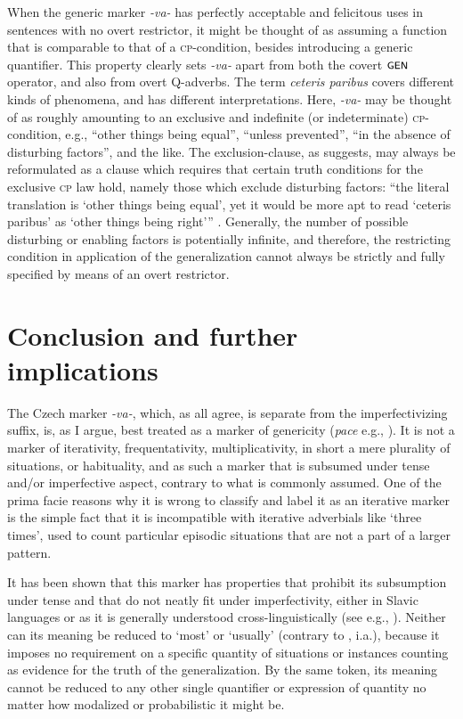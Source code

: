 \documentclass[output=paper,colorlinks,citecolor=brown]{langscibook}
\begin{document}
When the generic marker \textit{-va-} has perfectly acceptable and felicitous uses in sentences with no overt restrictor, it might
be thought of as assuming a function
that is comparable to that of a \textsc{cp}-condition, besides introducing a generic quantifier. This property clearly sets \textit{-va-} apart  from
both the covert $\cnst{Gen}$ operator, and also from overt Q-adverbs.
The term \textit{ceteris paribus} covers different kinds of phenomena, and has different interpretations. Here, \textit{-va-} may be thought of as roughly amounting to an exclusive and indefinite
(or indeterminate) \textsc{cp}-condition, e.g., ``other things being equal'', ``unless prevented'', ``in the absence of disturbing factors'', and the like. The exclusion-clause, as \citet{Cartwright1983} suggests,
may always be reformulated as a clause which requires that certain truth conditions for the exclusive \textsc{cp} law hold, namely those which exclude disturbing factors: ``the literal translation is `other things being equal’, yet it would be more apt to read `ceteris paribus’ as `other things being right’”
\citep[45]{Cartwright1983}. Generally, the number of possible disturbing or enabling factors
is potentially infinite, and therefore, the restricting condition in application of the generalization cannot always be strictly and fully specified by means of an overt restrictor.







\section{Conclusion and further implications} \label{independence.tenseaspect}

The Czech marker \textit{-va-}, which, as all agree, is separate from
the imperfectivizing suffix, is, as I argue,
best treated as a marker of genericity (\textit{pace} e.g., \citealt{dahl1995}). It is not a
marker of iterativity, frequentativity, multiplicativity, in short a mere plurality of situations,
or habituality, and as such a marker that is subsumed under tense and/or imperfective aspect, contrary to what is commonly assumed.
One of the prima facie reasons why it is wrong to classify and label it as an iterative marker is the simple fact that it is incompatible with iterative adverbials like `three times', used to count particular episodic situations that are not a part of a larger pattern.

It has been shown
that this marker has properties that prohibit its subsumption under tense and that do not neatly fit under imperfectivity, either in Slavic languages
or as it is generally understood cross-linguistically (see e.g., \citealt{Comrie1976}).
Neither can its meaning be reduced to `most' or `usually' (contrary to \citet{dahl1995}, i.a.), because it imposes no requirement on a specific quantity of situations or instances counting as evidence for the truth of the generalization.
By the same token, its meaning cannot be reduced to any other single quantifier or expression of quantity
no matter how modalized or probabilistic it might be.
\end{document}
